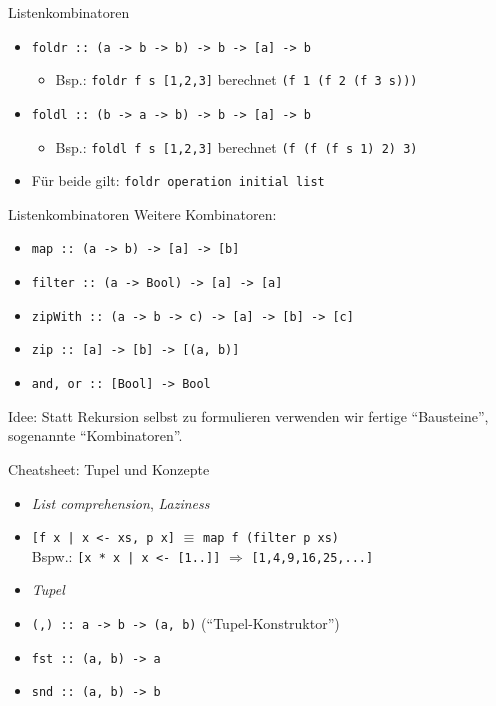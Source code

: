\documentclass{beamer}
\begin{document}
\begin{frame}{Listenkombinatoren}
  \begin{itemize}
    \item \texttt{foldr :: (a -> b -> b) -> b -> [a] -> b}
        \begin{itemize}
            \item Bsp.: \texttt{foldr f s [1,2,3]} berechnet \texttt{(f 1 (f 2 (f 3 s)))}
        \end{itemize}
    \item \texttt{foldl :: (b -> a -> b) -> b -> [a] -> b}
        \begin{itemize} 
            \item Bsp.: \texttt{foldl f s [1,2,3]} berechnet \texttt{(f (f (f s 1) 2) 3)}
        \end{itemize}
    \item Für beide gilt: \texttt{foldr operation initial list}
  \end{itemize}
\end{frame}

\begin{frame}{Listenkombinatoren}
    Weitere Kombinatoren:
    \begin{itemize}
        \item \texttt{map :: (a -> b) -> [a] -> [b]}
        \item \texttt{filter :: (a -> Bool) -> [a] -> [a]}
        \item \texttt{zipWith :: (a -> b -> c) -> [a] -> [b] -> [c]}
        \item \texttt{zip :: [a] -> [b] -> [(a, b)]}
        \item \texttt{and, or :: [Bool] -> Bool}
    \end{itemize}
    Idee: Statt Rekursion selbst zu formulieren verwenden wir fertige \enquote{Bausteine}, sogenannte \enquote{Kombinatoren}.
\end{frame}

\begin{frame}{Cheatsheet: Tupel und Konzepte}
  \begin{itemize}
    \item \emph{List comprehension}, \emph{Laziness}
    \item \texttt{[f x | x <- xs, p x]} $\equiv$ \texttt{map f (filter p xs)}\\
      Bspw.: \texttt{[x * x | x <- [1..]]} $\Rightarrow$ \texttt{[1,4,9,16,25,...]}
    \item \emph{Tupel}
    \item \texttt{(,) :: a -> b -> (a, b)} (\enquote{Tupel-Konstruktor})
    \item \texttt{fst :: (a, b) -> a}
    \item \texttt{snd :: (a, b) -> b}
  \end{itemize}
\end{frame}
\end{document}
